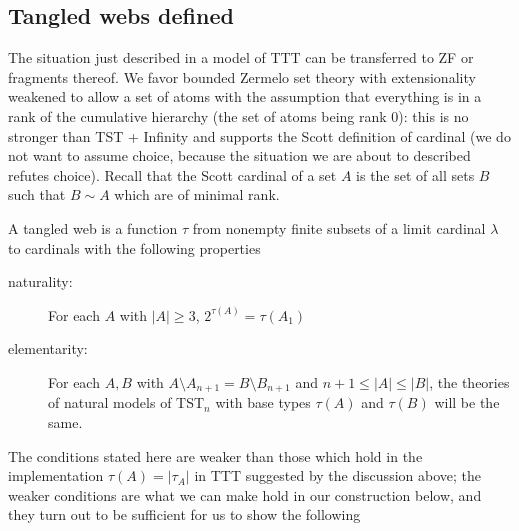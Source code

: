 \documentclass[12pt]{article}
\begin{document}
\newpage

\subsection{Tangled webs defined}

The situation just described in a model of TTT can be transferred to ZF or fragments thereof.  We favor bounded Zermelo set theory with extensionality weakened to allow a set of atoms with the assumption that everything is
in a rank of the cumulative hierarchy (the set of atoms being rank 0):  this is no stronger than TST + Infinity and supports the Scott definition of cardinal (we do not want to assume choice, because the situation we are about to described refutes choice).  Recall that the Scott cardinal of a set $A$ is the set of all sets $B$ such that $B \sim A$ which are of minimal rank.

A tangled web is a function $\tau$ from nonempty finite subsets of a limit cardinal $\lambda$ to cardinals with the following properties

\begin{description}

\item[naturality:]  For each $A$ with $|A| \geq 3$, $2^{\tau(A)} = \tau(A_1)$

\item[elementarity:]  For each $A,B$ with $A\setminus A_{n+1} = B \setminus B_{n+1}$ and $n+1\leq|A|\leq |B|$, the theories of natural models of TST$_n$ with base types $\tau(A)$ and $\tau(B)$ will be the same.

\end{description}

The conditions stated here are weaker than those which hold in the implementation $\tau(A) = |\tau_A|$ in TTT suggested by the discussion above;  the weaker conditions are what we can make hold in our construction below, and they turn out to be sufficient 
for us to show the following
\end{document}
